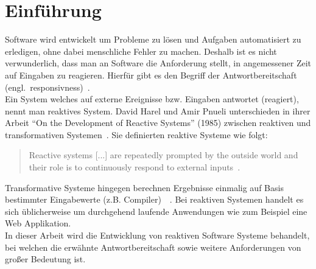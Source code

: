 \chapter{Einführung}\label{sec:einfuehrung}
Software wird entwickelt um Probleme zu lösen und Aufgaben automatisiert zu erledigen, ohne dabei menschliche Fehler zu machen. Deshalb ist es nicht verwunderlich, dass man an Software die Anforderung stellt, in angemessener Zeit auf Eingaben zu reagieren. Hierfür gibt es den Begriff der Antwortbereitschaft (engl.\ responsivness)~\cite[S.~18]{kuhn_reactive_2015}.\\
Ein System welches auf externe Ereignisse bzw. Eingaben antwortet (reagiert), nennt man reaktives System. David Harel und Amir Pnueli unterschieden in ihrer Arbeit \enquote{On the Development of Reactive Systems} (1985) zwischen reaktiven und transformativen Systemen~\cite{harel_development_1985}. Sie definierten reaktive Systeme wie folgt:

\begin{quotation}
  Reactive systems [...] are repeatedly prompted by the outside world and their role is to continuously respond to external inputs~\cite{harel_development_1985}.
\end{quotation}

Transformative Systeme hingegen berechnen Ergebnisse einmalig auf Basis bestimmter Eingabewerte (z.B. Compiler)~\cite[S.~2]{carkci_dataflow_2014}~\cite{wieringa_design_2003}. Bei reaktiven Systemen handelt es sich üblicherweise um durchgehend laufende Anwendungen wie zum Beispiel eine Web Applikation.\\
In dieser Arbeit wird die Entwicklung von reaktiven Software Systeme behandelt, bei welchen die erwähnte Antwortbereitschaft sowie weitere Anforderungen von großer Bedeutung ist.

\pagebreak

